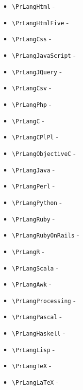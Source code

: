 \documentclass[oneside,10pt,a4paper]{jsarticle}
\begin{document}
  \begin{itemize}
    \item \verb|\PrLangHtml| - \PrLangHtml
    \item \verb|\PrLangHtmlFive| - \PrLangHtmlFive
    \item \verb|\PrLangCss| - \PrLangCss
    \item \verb|\PrLangJavaScript| - \PrLangJavaScript
    \item \verb|\PrLangJQuery| - \PrLangJQuery
    \item \verb|\PrLangCsv| - \PrLangCsv
    \item \verb|\PrLangPhp| - \PrLangPhp
    \item \verb|\PrLangC| - \PrLangC
    \item \verb|\PrLangCPlPl| - \PrLangCPlPl
    \item \verb|\PrLangObjectiveC| - \PrLangObjectiveC
    \item \verb|\PrLangJava| - \PrLangJava
    \item \verb|\PrLangPerl| - \PrLangPerl
    \item \verb|\PrLangPython| - \PrLangPython
    \item \verb|\PrLangRuby| - \PrLangRuby
    \item \verb|\PrLangRubyOnRails| - \PrLangRubyOnRails
    \item \verb|\PrLangR| - \PrLangR
    \item \verb|\PrLangScala| - \PrLangScala
    \item \verb|\PrLangAwk| - \PrLangAwk
    \item \verb|\PrLangProcessing| - \PrLangProcessing
    \item \verb|\PrLangPascal| - \PrLangPascal
    \item \verb|\PrLangHaskell| - \PrLangHaskell
    \item \verb|\PrLangLisp| - \PrLangLisp
    \item \verb|\PrLangTeX| - \PrLangTeX
    \item \verb|\PrLangLaTeX| - \PrLangLaTeX
  \end{itemize}
\end{document}
